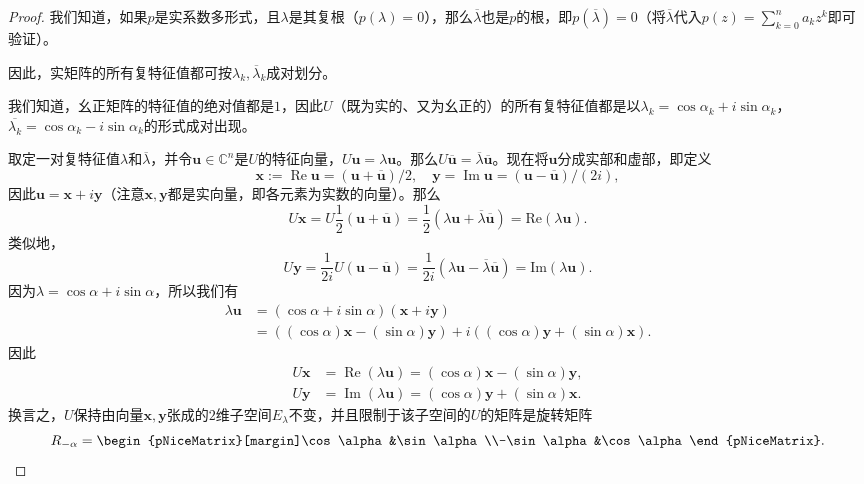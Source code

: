 \begin{proof}
    我们知道，如果$p$是实系数多形式，且$\lambda$是其复根（$p(\lambda)=0$），那么$\overline{\lambda}$也是$p$的根，即$p(\overline{\lambda})=0$（将$\overline{\lambda}$代入$p(z)=\sum_{k=0}^{n}a_kz^k$即可验证）。

    因此，实矩阵的所有复特征值都可按$\lambda_k,\overline{\lambda}_k$成对划分。

    我们知道，幺正矩阵的特征值的绝对值都是$1$，因此$U$（既为实的、又为幺正的）的所有复特征值都是以$\lambda_k=\cos\alpha_k+i\sin\alpha_k$，$\overline{\lambda_k}=\cos\alpha_k-i\sin\alpha_k$的形式成对出现。

    取定一对复特征值$\lambda$和$\overline{\lambda}$，并令$\mathbf{u}\in\mathbb{C}^n$是$U$的特征向量，$U\mathbf{u}=\lambda\mathbf{u}$。那么$U\overline{\mathbf{u}}=\overline{\lambda}\overline{\mathbf{u}}$。现在将$\mathbf{u}$分成实部和虚部，即定义
    \[\mathbf{x}:=\operatorname{Re}\mathbf{u}=(\mathbf{u}+\overline{\mathbf{u}})/2,\quad\mathbf{y}=\operatorname{Im}\mathbf{u}=(\mathbf{u}-\overline{\mathbf{u}})/(2i),\]
    因此$\mathbf{u}=\mathbf{x}+i\mathbf{y}$（注意$\mathbf{x},\mathbf{y}$都是实向量，即各元素为实数的向量）。那么
    \[U\mathbf{x}=U\frac{1}{2}(\mathbf{u}+\overline{\mathbf{u}})=\frac{1}{2}(\lambda\mathbf{u}+\overline{\lambda}\overline{\mathbf{u}})=\mathrm{Re}(\lambda\mathbf{u}).\]
    类似地，
    \[U\mathbf{y}=\frac{1}{2i}U(\mathbf{u}-\overline{\mathbf{u}})=\frac{1}{2i}(\lambda\mathbf{u}-\overline{\lambda}\overline{\mathbf{u}})=\mathrm{Im}(\lambda\mathbf{u}).\]
    因为$\lambda=\cos\alpha+i\sin\alpha$，所以我们有
    \begin{align*}
        \lambda\mathbf{u}&=(\cos\alpha+i\sin\alpha)(\mathbf{x}+i\mathbf{y})\\
        &=((\cos\alpha)\mathbf{x}-(\sin\alpha)\mathbf{y})+i((\cos\alpha)\mathbf{y}+(\sin\alpha)\mathbf{x}).
    \end{align*}
    因此
    \begin{align*}
        U\mathbf{x}&=\operatorname{Re}(\lambda\mathbf{u})=(\cos\alpha)\mathbf{x}-(\sin\alpha)\mathbf{y},\\
        U\mathbf{y}&=\operatorname{Im}(\lambda\mathbf{u})=(\cos\alpha)\mathbf{y}+(\sin\alpha)\mathbf{x}.
    \end{align*}
    换言之，$U$保持由向量$\mathbf{x},\mathbf{y}$张成的$2$维子空间$E_\lambda$不变，并且限制于该子空间的$U$的矩阵是旋转矩阵
    \[R_{-\alpha}=\begin{pNiceMatrix}[margin]\cos\alpha&\sin\alpha\\-\sin\alpha&\cos\alpha\end{pNiceMatrix}.\]


\end{proof}
